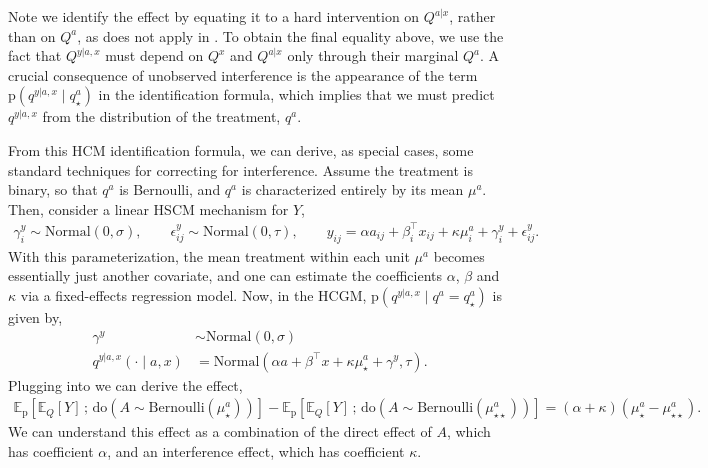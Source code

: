 \documentclass[12pt]{article}
\newcommand{\rmdo}{\mathrm{do}}
\newcommand{\s}{\, ; \,}
\newcommand{\pr}{\mathrm{p}}
\begin{document}
Note we identify the effect by equating it to a hard intervention on $Q^{a|x}$, rather than on $Q^a$, as  does not apply in .
To obtain the final equality above, we use the fact that $Q^{y|a,x}$ must depend on $Q^x$ and $Q^{a|x}$ only through their marginal $Q^a$.
A crucial consequence of unobserved interference is the appearance of the term $\pr(q^{y|a,x} \mid q_\star^{a})$ in the identification formula, which implies that we must predict $q^{y|a,x}$ from the distribution of the treatment, $q^a$.

From this HCM identification formula, we can derive, as special cases, some standard techniques for correcting for interference.
Assume the treatment is binary, so that $q^a$ is Bernoulli, and $q^a$ is characterized entirely by its mean $\mu^a$. Then, consider a linear HSCM mechanism for $Y$,
\begin{equation} \label{eqn:unobserve_interfere_linear}
\begin{split}
	\gamma^y_i \sim \mathrm{Normal}(0, \sigma), \quad\quad \epsilon^y_{ij} \sim \mathrm{Normal}(0, \tau), \quad\quad  y_{ij} = \alpha a_{ij} + \beta^\top_i x_{ij} + \kappa \mu^a_i + \gamma^y_i + \epsilon_{ij}^y. 
\end{split}
\end{equation}
With this parameterization, the mean treatment within each unit $\mu^a$ becomes essentially just another covariate, and one can estimate the coefficients $\alpha$, $\beta$ and $\kappa$ via a fixed-effects regression model.
Now, in the HCGM, $\pr(q^{y|a,x} \mid q^a = q_\star^{a})$ is given by,
\begin{equation} \label{eqn:unobserv_interfere_hcgm}
\begin{split}
\gamma^y &\sim \mathrm{Normal}(0, \sigma)\\
q^{y|a, x}(\cdot \mid a, x) &= \mathrm{Normal}(\alpha a + \beta^\top x + \kappa \mu^a_\star + \gamma^y, \tau).
\end{split}
\end{equation}
Plugging  into  we can derive the effect,
\begin{equation}
\begin{split}
	\mathbb{E}_\pr[\mathbb{E}_Q[Y] \s \rmdo(A \sim \mathrm{Bernoulli}(\mu^a_\star))] - \mathbb{E}_\pr[\mathbb{E}_Q[Y] \s \rmdo(A \sim \mathrm{Bernoulli}(\mu^a_{\star\star}))] = (\alpha + \kappa)(\mu^a_\star - \mu^a_{\star\star}).
\end{split}
\end{equation}
We can understand this effect as a combination of the direct effect of $A$, which has coefficient $\alpha$, and an interference effect, which has coefficient $\kappa$.
\end{document}
